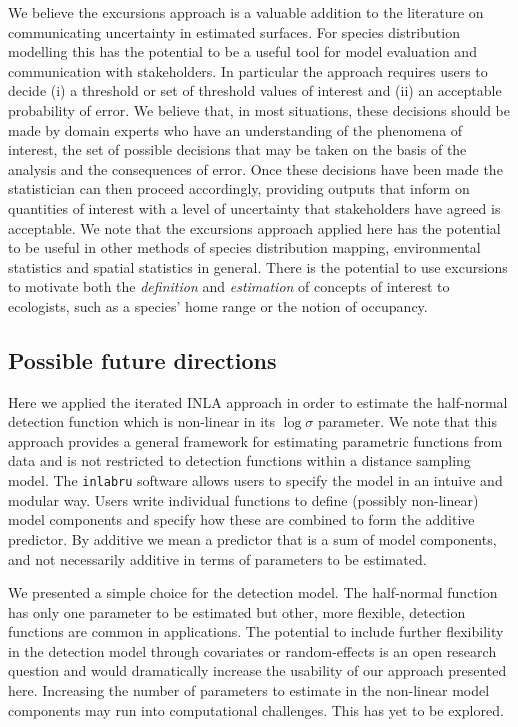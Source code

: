 \documentclass[preprint,12pt]{elsarticle}
\begin{document}
We believe the excursions approach is a valuable addition to the literature on communicating uncertainty in estimated surfaces.  For species distribution modelling this has the potential to be a useful tool for model evaluation and communication with stakeholders.  In particular the approach requires users to decide (i) a threshold or set of threshold values of interest and (ii) an acceptable probability of error. 
We believe that, in most situations, these decisions should be made by domain experts who have an understanding of the phenomena of interest, the set of possible decisions that may be taken on the basis of the analysis and the consequences of error.  Once these decisions have been made the statistician can then proceed accordingly, providing outputs  that inform on quantities of interest with a level of uncertainty that stakeholders have agreed is acceptable.  We note that the excursions approach applied here has the potential to be useful in other methods of species distribution mapping, environmental statistics and spatial statistics in general.  There is the potential to use excursions to motivate both the \textit{definition} and \textit{estimation} of concepts of interest to ecologists, such as a species' home range or the notion of occupancy. 

\subsection*{Possible future directions}

Here we applied the iterated INLA approach in order to estimate the half-normal detection function which is non-linear in its $\log \sigma$ parameter.  We note that this approach provides a general framework for estimating parametric functions from data and is not restricted to detection functions within a distance sampling model.  The \texttt{inlabru} software allows users to specify the model in an intuive and modular way.  Users write individual functions to define (possibly non-linear) model components and specify how these are combined to form the additive predictor.  By additive we mean a predictor that is a sum of model components, and not necessarily additive in terms of parameters to be estimated.

We presented a simple choice for the detection model.  The half-normal function has only one parameter to be estimated but other, more flexible, detection functions are common in applications.  The potential to include further flexibility in the detection model through covariates or random-effects is an open research question and would dramatically increase the usability of our approach presented here. Increasing the number of parameters to estimate in the non-linear model components may run into computational challenges.  This has yet to be explored.  
\end{document}
